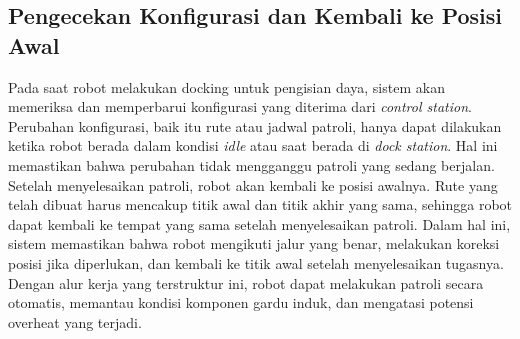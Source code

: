 \subsection{Pengecekan Konfigurasi dan Kembali ke Posisi Awal}
Pada saat robot melakukan docking untuk pengisian daya, sistem akan memeriksa dan memperbarui konfigurasi yang diterima dari \emph{control station}. Perubahan konfigurasi, baik itu rute atau jadwal patroli, hanya dapat dilakukan ketika robot berada dalam kondisi \emph{idle} atau saat berada di \emph{dock station}. Hal ini memastikan bahwa perubahan tidak mengganggu patroli yang sedang berjalan. Setelah menyelesaikan patroli, robot akan kembali ke posisi awalnya. Rute yang telah dibuat harus mencakup titik awal dan titik akhir yang sama, sehingga robot dapat kembali ke tempat yang sama setelah menyelesaikan patroli. Dalam hal ini, sistem memastikan bahwa robot mengikuti jalur yang benar, melakukan koreksi posisi jika diperlukan, dan kembali ke titik awal setelah menyelesaikan tugasnya. Dengan alur kerja yang terstruktur ini, robot dapat melakukan patroli secara otomatis, memantau kondisi komponen gardu induk, dan mengatasi potensi overheat yang terjadi.
